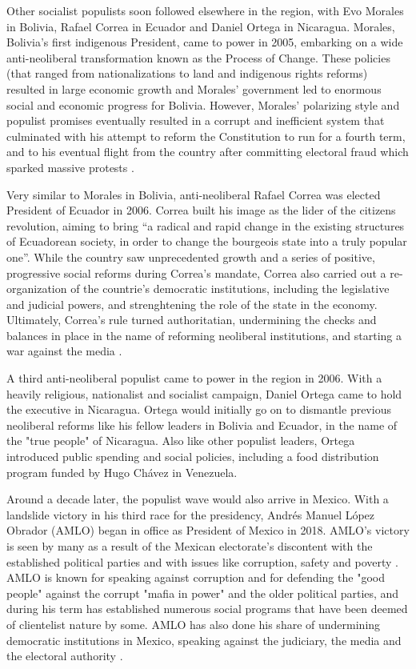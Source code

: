 \documentclass[12pt,letterpaper]{article}
\begin{document}
Other socialist populists soon followed elsewhere in the region, with Evo Morales in Bolivia, Rafael Correa in Ecuador and Daniel Ortega in Nicaragua. Morales, Bolivia's first indigenous President, came to power in 2005, embarking on a wide anti-neoliberal transformation known as the Process of Change. These policies (that ranged from nationalizations to land and indigenous rights reforms) resulted in large economic growth and Morales' government led to enormous social and economic progress for Bolivia. However, Morales' polarizing style and populist promises eventually resulted in a corrupt and inefficient system that culminated with his attempt to reform the Constitution to run for a fourth term, and to his eventual flight from the country after committing electoral fraud which sparked massive protests \autocite{smithELEVENYEARSPROCESS}. 

Very similar to Morales in Bolivia, anti-neoliberal Rafael Correa was elected President of Ecuador in 2006. Correa built his image as the lider of the citizens revolution, aiming to bring “a radical and rapid change in the existing structures of Ecuadorean society, in order to change the bourgeois state into a truly popular one”\autocite{torrePeopleDemocracyAuthoritarianism2014}. While the country saw unprecedented growth and a series of positive, progressive social reforms during Correa's mandate, Correa also carried out a re-organization of the countrie's democratic institutions, including the legislative and judicial powers, and strenghtening the role of the state in the economy. Ultimately, Correa's rule turned authoritatian, undermining the checks and balances in place in the name of reforming neoliberal institutions, and starting a war against the media \autocite{torrePeopleDemocracyAuthoritarianism2014}. 

A third anti-neoliberal populist came to power in the region in 2006. With a heavily religious, nationalist and socialist campaign, Daniel Ortega came to hold the executive in Nicaragua. Ortega would initially go on to dismantle previous neoliberal reforms like his fellow leaders in Bolivia and Ecuador, in the name of the "true people" of Nicaragua. Also like other populist leaders, Ortega introduced public spending and social policies, including a food distribution program funded by Hugo Chávez in Venezuela. 

Around a decade later, the populist wave would also arrive in Mexico. With a landslide victory in his third race for the presidency, Andrés Manuel López Obrador (AMLO) began in office as President of Mexico in 2018. AMLO's victory is seen by many as a result of the Mexican electorate's discontent with the established political parties and with issues like corruption, safety and poverty \autocite{morenoVirajeElectoralOpinion}. AMLO is known for speaking against corruption and for defending the "good people" against the corrupt "mafia in power" and the older political parties, and during his term has established numerous social programs that have been deemed of clientelist nature by some. AMLO has also done his share of undermining democratic institutions in Mexico, speaking against the judiciary, the media and the electoral authority \autocite{AMLOInstitutionsHow}. 
\end{document}
